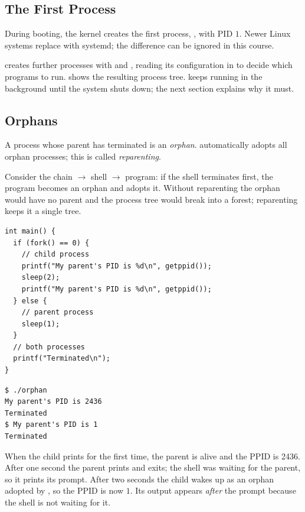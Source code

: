 \subsection{The First Process}

\begin{definition}
  During booting, the kernel creates the first process, , with PID $1$. Newer Linux systems replace  with systemd; the difference can be ignored in this course.
\end{definition}

 creates further processes with  and , reading its configuration in  to decide which programs to run.  shows the resulting process tree.  keeps running in the background until the system shuts down; the next section explains why it must.

\subsection{Orphans}

\begin{definition}
  A process whose parent has terminated is an \emph{orphan}.  automatically adopts all orphan processes; this is called \emph{reparenting}.
\end{definition}

Consider the chain  $\to$ shell $\to$ program: if the shell terminates first, the program becomes an orphan and  adopts it. Without reparenting the orphan would have no parent and the process tree would break into a forest; reparenting keeps it a single tree.

\begin{example}
\begin{lstlisting}
int main() {
  if (fork() == 0) {
    // child process
    printf("My parent's PID is %d\n", getppid());
    sleep(2);
    printf("My parent's PID is %d\n", getppid());
  } else {
    // parent process
    sleep(1);
  }
  // both processes
  printf("Terminated\n");
}
\end{lstlisting}
\begin{lstlisting}[style=sh]
$ ./orphan
My parent's PID is 2436
Terminated
$ My parent's PID is 1
Terminated
\end{lstlisting}
  When the child prints for the first time, the parent is alive and the PPID is 2436. After one second the parent prints  and exits; the shell was waiting for the parent, so it prints its prompt. After two seconds the child wakes up as an orphan adopted by , so the PPID is now $1$. Its output appears \emph{after} the prompt because the shell is not waiting for it.
\end{example}

